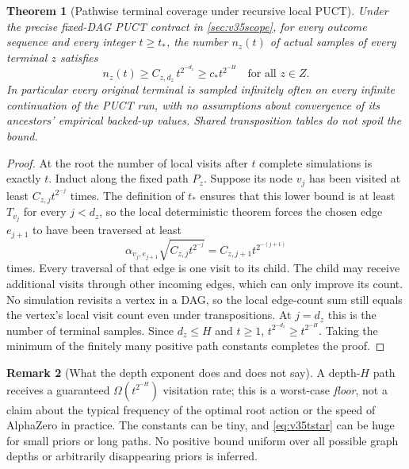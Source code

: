 \documentclass{article}
\theoremstyle{plain}
\newtheorem{theorem}{Theorem}[section]
\theoremstyle{definition}
\newtheorem{remark}[theorem]{Remark}
\begin{document}
\begin{theorem}[Pathwise terminal coverage under recursive local PUCT]
\label{thm:v35dag}
Under the precise fixed-DAG PUCT contract in
\cref{sec:v35scope}, for every outcome sequence and every integer
$t\ge t_*$, the number $n_z(t)$ of actual samples of every terminal
$z$ satisfies
\begin{equation}
 \boxed{\qquad
 n_z(t)\ge C_{z,d_z}\,t^{2^{-d_z}}
 \ge c_*t^{2^{-H}}
 \quad\text{for all }z\in Z.
 \qquad}
 \label{eq:v35terminalvisits}
\end{equation}
In particular every original terminal is sampled infinitely often
on every infinite continuation of the PUCT run, with no assumptions
about convergence of its ancestors' empirical backed-up values.
Shared transposition tables do not spoil the bound.
\end{theorem}
\begin{proof}
At the root the number of local visits after $t$ complete simulations is
exactly $t$. Induct along the fixed path $P_z$. Suppose its node $v_j$
has been visited at least $C_{z,j}t^{2^{-j}}$ times.
The definition of $t_*$ ensures that this lower bound is at least
$T_{v_j}$ for every $j<d_z$, so the local deterministic theorem
forces the chosen edge $e_{j+1}$ to have been traversed at least
\[
 \alpha_{v_j,e_{j+1}}
 \sqrt{C_{z,j}t^{2^{-j}}}
 =C_{z,j+1}t^{2^{-(j+1)}}
\]
times. Every traversal of that edge is one visit to its child.
The child may receive additional visits through other incoming edges,
which can only improve its count. No simulation revisits a vertex in a
DAG, so the local edge-count sum still equals the vertex's local visit
count even under transpositions. At $j=d_z$ this is the number of
terminal samples. Since $d_z\le H$ and $t\ge1$,
$t^{2^{-d_z}}\ge t^{2^{-H}}$. Taking the minimum of the finitely
many positive path constants completes the proof.
\end{proof}

\begin{remark}[What the depth exponent does and does not say]
A depth-$H$ path receives a guaranteed $\Omega(t^{2^{-H}})$
visitation rate; this is a worst-case \emph{floor}, not a claim about
the typical frequency of the optimal root action or the speed of
AlphaZero in practice. The constants can be tiny, and
\eqref{eq:v35tstar} can be huge for small priors or long paths.
No positive bound uniform over all possible graph depths or
arbitrarily disappearing priors is inferred.
\end{remark}
\end{document}
